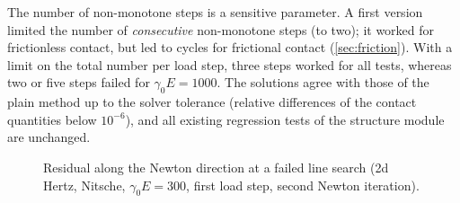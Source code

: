\documentclass[11pt,a4paper]{article}
\begin{document}
The number of non-monotone steps is a sensitive parameter. A first version limited the number of
\emph{consecutive} non-monotone steps (to two); it worked for frictionless contact, but led to
cycles for frictional contact (\cref{sec:friction}). With a limit on the total number per load
step, three steps worked for all tests, whereas two or five steps failed for $\gamma_0E=1000$. The solutions agree with those of the plain method up to the solver
tolerance (relative differences of the contact quantities below $10^{-6}$), and all existing
regression tests of the structure module are unchanged.

\begin{figure}[ht]
  \centering
  \caption{Residual along the Newton direction at a failed line search (2d Hertz, Nitsche,
  $\gamma_0E=300$, first load step, second Newton iteration).}
  \label{fig:kink}
\end{figure}
\end{document}

